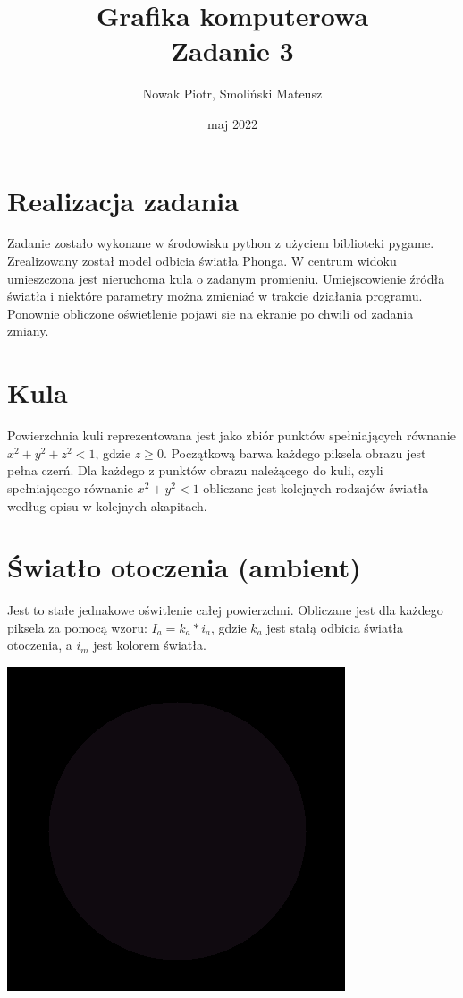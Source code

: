 \documentclass[a4paper,11pt]{article}
\title{Grafika komputerowa \\
{Zadanie 3}}
\author{Nowak Piotr, Smoliński Mateusz}
\date{maj 2022}
\begin{document}
\maketitle

\section{Realizacja zadania}
Zadanie zostało wykonane w środowisku python z użyciem biblioteki 
pygame. Zrealizowany został model odbicia światła Phonga. 
W centrum widoku umieszczona jest 
nieruchoma kula o zadanym promieniu. Umiejscowienie źródła światła 
i niektóre parametry można zmieniać w trakcie działania programu.
Ponownie obliczone oświetlenie pojawi sie na ekranie po chwili od 
zadania zmiany.

\section{Kula}
Powierzchnia kuli reprezentowana jest jako zbiór punktów 
spełniających równanie \(x^2 + y^2 + z^2 < 1\), gdzie \(z \geqslant 
0\). Początkową barwa każdego piksela obrazu jest pełna czerń. 
Dla każdego z punktów obrazu należącego do kuli, czyli 
spełniającego równanie \(x^2 + y^2 < 1\) obliczane jest  
kolejnych rodzajów światła według opisu w kolejnych 
akapitach.

\section{Światło otoczenia (ambient)}
Jest to stałe jednakowe oświtlenie całej powierzchni. Obliczane jest 
dla każdego piksela za pomocą wzoru: \(I_a = k_a * i_a\), gdzie \(k_a\) 
jest stałą odbicia światła otoczenia, a \(i_m\) jest kolorem światła.
\begin{center}
    \includegraphics[width=0.3\columnwidth]{ambient.png}
\end{center}
\end{document}
